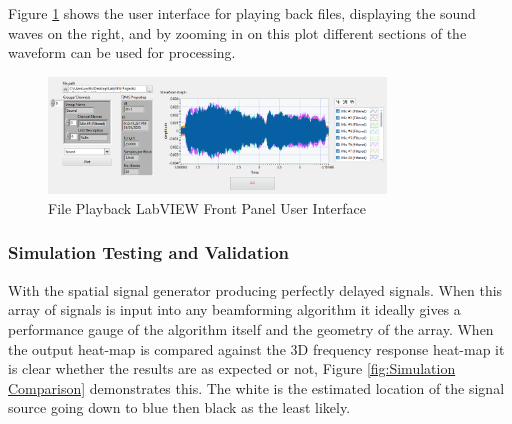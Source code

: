\documentclass{UoNMCHA}
\numberwithin{equation}{section}
\begin{document}
Figure \ref{fig:FilePlaybackPanel} shows the user interface for playing back files, displaying the sound waves on the right, and by zooming in on this plot different sections of the waveform can be used for processing.

    \begin{figure}[H]
        \centering
        \includegraphics[keepaspectratio, width = 0.8\textwidth]{Figures/FilePlaybackPanel.png}
        \caption{File Playback LabVIEW Front Panel User Interface}
        \label{fig:FilePlaybackPanel}
    \end{figure}  

\subsubsection{Simulation Testing and Validation} \label{sec:Sim Testing and Verification} 
    
   With the spatial signal generator producing perfectly delayed signals. When this array of signals is input into any beamforming algorithm it ideally gives a performance gauge of the algorithm itself and the geometry of the array. When the output heat-map is compared against the 3D frequency response heat-map it is clear whether the results are as expected or not, Figure \ref{fig:Simulation Comparison} demonstrates this. The white is the estimated location of the signal source going down to blue then black as the least likely.
    
\end{document}
